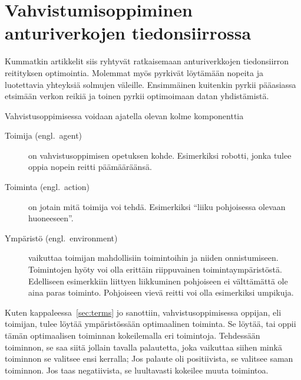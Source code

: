 

\section{Vahvistumisoppiminen anturiverkojen tiedonsiirrossa}
\label{sec:solution}

Kummatkin artikkelit siis ryhtyvät ratkaisemaan anturiverkkojen tiedonsiirron
reitityksen optimointia. Molemmat myös pyrkivät löytämään nopeita ja
luotettavia yhteyksiä solmujen väleille. Ensimmäinen kuitenkin pyrkii
pääasiassa etsimään verkon reikiä ja toinen pyrkii optimoimaan datan
yhdistämistä.

Vahvistusoppimisessa voidaan ajatella olevan kolme komponenttia
\begin{description}
  \item[Toimija (engl.\ agent)] on vahvistusoppimisen opetuksen kohde. Esimerkiksi
    robotti, jonka tulee oppia nopein reitti päämääräänsä.
  \item[Toiminta (engl.\ action)] on jotain mitä toimija voi tehdä. Esimerkiksi ``liiku
    pohjoisessa olevaan huoneeseen''.
  \item[Ympäristö (engl.\ environment)] vaikuttaa toimijan mahdollisiin toimintoihin ja
    niiden onnistumiseen. Toimintojen hyöty voi olla erittäin riippuvainen
    toimintaympäristöstä. Edelliseen esimerkkiin liittyen liikkuminen
    pohjoiseen ei välttämättä ole aina paras toiminto. Pohjoiseen vievä reitti
    voi olla esimerkiksi umpikuja.
\end{description}
Kuten kappaleessa~\ref{sec:terms} jo sanottiin, vahvistusoppimisessa oppijan,
eli toimijan, tulee löytää ympäristössään optimaalinen toiminta. Se löytää, tai
oppii tämän optimaalisen toiminnan kokeilemalla eri toimintoja. Tehdessään
toiminnon, se saa siitä jollain tavalla palautetta, joka vaikuttaa siihen minkä
toiminnon se valitsee ensi kerralla; Jos palaute oli positiivista, se valitsee
saman toiminnon. Jos taas negatiivista, se luultavasti kokeilee muuta
toimintoa.

